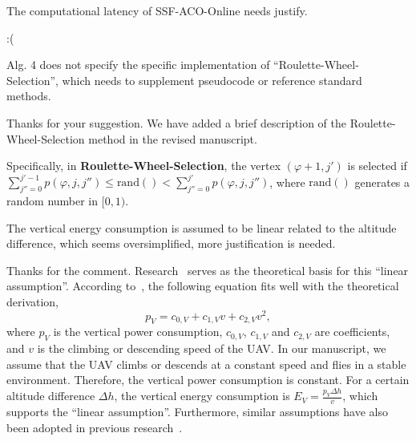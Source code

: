 \reviewer

\begin{revcomment} %
	The computational latency of SSF-ACO-Online needs justify.
\end{revcomment}
\begin{revresponse}
	:(
\end{revresponse}

\begin{revcomment}
	Alg. 4 does not specify the specific implementation of ``Roulette-Wheel-Selection'', which needs to supplement pseudocode or reference standard methods.
\end{revcomment}
\begin{revresponse}
	Thanks for your suggestion.
	We have added a brief description of the Roulette-Wheel-Selection method in the revised manuscript.
	\begin{changes}
		Specifically, in \textbf{Roulette-Wheel-Selection}, the vertex $(\varphi+1, j')$ is selected if $\sum_{j''=0}^{j'-1}{p(\varphi,j,j'')}\leq \text{rand}() < \sum_{j''=0}^{j'}{p(\varphi,j,j'')}$, where $\text{rand}()$ generates a random number in $[0,1)$.
	\end{changes}
\end{revresponse}

\begin{revcomment}
	The vertical energy consumption is assumed to be linear related to the altitude difference, which seems oversimplified, more justification is needed.
\end{revcomment}
\begin{revresponse}
	Thanks for the comment.
	Research~\cite{vertical-assumption} serves as the theoretical basis for this ``linear assumption''.
	According to~\cite{vertical-assumption}, the following equation fits well with the theoretical derivation,
	\begin{equation}
		p_V = c_{0,V} + c_{1,V}v + c_{2,V}v^2,
	\end{equation}
	where $p_V$ is the vertical power consumption, $c_{0,V}$, $c_{1,V}$ and $c_{2,V}$ are coefficients, and $v$ is the climbing or descending speed of the UAV.
	In our manuscript, we assume that the UAV climbs or descends at a constant speed and flies in a stable environment.
	Therefore, the vertical power consumption is constant.
	For a certain altitude difference $\Delta h$, the vertical energy consumption is $E_V=\frac{p_V\Delta h}{v}$, which supports the ``linear assumption''.
	Furthermore, similar assumptions have also been adopted in previous research~\cite{mgh}.
\end{revresponse}


